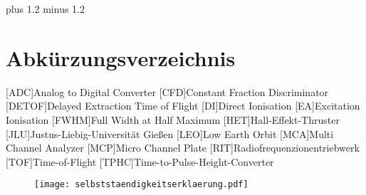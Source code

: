 \documentclass[fontsize=11pt,%
twoside,
BCOR          = 8mm]{scrreprt}
\author{Lorenz Saalmann}
\begin{document}
\font plus 1.2\font
minus 1.2\font






\cleardoublepage

\tableofcontents
\cleardoublepage

\listoffigures
\clearpage
\listoftables
\clearpage
\section*{\Large Abkürzungsverzeichnis}
\begin{acronym}
  [ADC]{\dotfill Analog to Digital Converter}  
  [CFD]{\dotfill Constant Fraction Discriminator}  
  [DETOF]{\dotfill Delayed Extraction Time of Flight}
  [DI]{\dotfill Direct Ionisation}  
  [EA]{\dotfill Excitation Ionisation}  
  [FWHM]{\dotfill Full Width at Half Maximum}  
  [HET]{\dotfill Hall-Effekt-Thruster}  
  [JLU]{\dotfill Justus-Liebig-Universit\"{a}t Gie{\ss}en}  
  [LEO]{\dotfill Low Earth Orbit}  
  [MCA]{\dotfill Multi Channel Analyzer}  
  [MCP]{\dotfill Micro Channel Plate}  
  [RIT]{\dotfill Radiofrequenzionentriebwerk}  
  [TOF]{\dotfill Time-of-Flight}  
  [TPHC]{\dotfill Time-to-Pulse-Height-Converter}  


\end{acronym}
\cleardoublepage

\onehalfspacing

\cleardoublepage


\cleardoublepage

\cleardoublepage

\cleardoublepage

\cleardoublepage

\clearpage

\cleardoublepage
\renewcommand\bibname{Literaturverzeichnis}
{}
\printbibliography
\cleardoublepage


\fontsize{12pt}{12pt}\selectfont
\clearpage
\begin{figure}
  \centering
  \hspace*{-3.5cm}\texttt{[image: selbststaendigkeitserklaerung.pdf]}
\end{figure}
\end{document}
